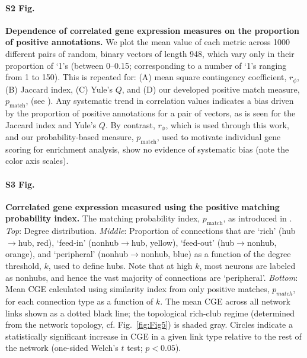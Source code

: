 \documentclass[10pt,letterpaper]{article}
\begin{document}
\paragraph*{S2 Fig.}
\label{S2_Fig}
{\bf Dependence of correlated gene expression measures on the proportion of positive annotations.} We plot the mean value of each metric across 1000 different pairs of random, binary vectors of length 948, which vary only in their proportion of `1's (between 0--0.15; corresponding to a number of `1's ranging from 1 to 150).
This is repeated for:
(A) mean square contingency coefficient, $r_\phi$,
(B) Jaccard index,
(C) Yule's $Q$, and
(D) our developed positive match measure, $p_\mathrm{match}$, (see ).
Any systematic trend in correlation values indicates a bias driven by the proportion of positive annotations for a pair of vectors, as is seen for the Jaccard index and Yule's $Q$.
By contrast, $r_\phi$, which is used through this work, and our probability-based measure, $p_\mathrm{match}$, used to motivate individual gene scoring for enrichment analysis, show no evidence of systematic bias (note the color axis scales).

\paragraph*{S3 Fig.}
\label{S3_Fig}
{\bf Correlated gene expression measured using the positive matching probability index.} The matching probability index, $p_\mathrm{match}$, as introduced in . 
\emph{Top}: Degree distribution.
\emph{Middle}: Proportion of connections that are `rich' (hub$\rightarrow$hub, red), `feed-in' (nonhub$\rightarrow$hub, yellow), `feed-out' (hub$\rightarrow$nonhub, orange), and `peripheral' (nonhub$\rightarrow$nonhub, blue) as a function of the degree threshold, $k$, used to define hubs.
Note that at high $k$, most neurons are labeled as nonhubs, and hence the vast majority of connections are `peripheral'.
\emph{Bottom}: Mean CGE calculated using similarity index from only positive matches, $p_{match}$, for each connection type as a function of $k$.
The mean CGE across all network links shown as a dotted black line; the topological rich-club regime (determined from the network topology, cf. Fig.~\ref{fig:Fig5}) is shaded gray.
Circles indicate a statistically significant increase in CGE in a given link type relative to the rest of the network (one-sided Welch's $t$ test; $p < 0.05$).
\end{document}
